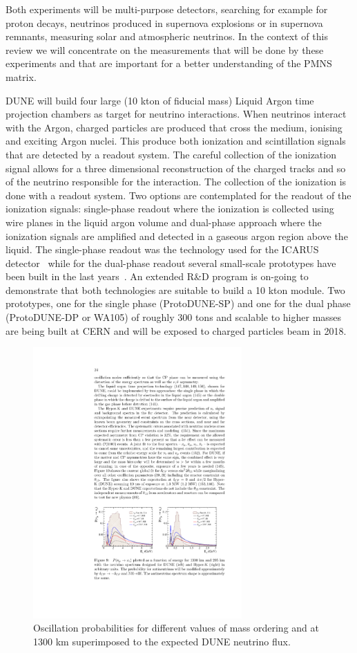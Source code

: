 Both experiments will be multi-purpose detectors, searching for example for proton decays, neutrinos produced in supernova explosions or in supernova remnants, measuring solar and atmospheric neutrinos. In the context of this review we will concentrate on the measurements that will be done by these experiments and that are important for a better understanding of the PMNS matrix.

DUNE will build four large (10 kton of fiducial mass) Liquid Argon time projection chambers as target for neutrino interactions. When neutrinos interact with the Argon, charged particles are produced that cross the medium, ionising and exciting Argon nuclei. This produce both ionization and scintillation signals that are detected by a readout system. The careful collection of the ionization signal allows for a three dimensional reconstruction of the charged tracks and so of the neutrino responsible for the interaction. The collection of the ionization is done with a readout system. Two options are contemplated for the readout of the ionization signals: single-phase readout where the ionization is collected using wire planes in the liquid argon volume and dual-phase approach where the ionization signals are amplified and detected in a gaseous argon region above the liquid. The single-phase readout was the technology used for the ICARUS detector~\cite{CANCI20121257} while for the dual-phase readout several small-scale prototypes have been built in the last years~\cite{}. An extended R\&D program is on-going to demonstrate that both technologies are suitable to build a 10 kton module. Two prototypes, one for the single phase (ProtoDUNE-SP) and one for the dual phase (ProtoDUNE-DP or WA105) of roughly 300 tons and scalable to higher masses are being built at CERN and will be exposed to charged particles beam in 2018.  

\begin{figure} [htbp!]
\begin{center}
\includegraphics[width=8cm]{figures/dune_flux.pdf}
\caption{\label{fig:duneflux} Oscillation probabilities for different values of mass ordering and \dcp at 1300 km superimposed to the expected DUNE neutrino flux.}
\end{center}
\end{figure}


